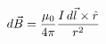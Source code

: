 \documentclass[preview]{standalone}
\begin{document}
\begin{align*}
\special{dvisvgm:raw <g id='unique000'>}d\vec{B} = \frac{\mu_0}{4\pi}\frac{I\,d\vec{l}\times\hat{r}}{r^2}\special{dvisvgm:raw </g>}
\end{align*}
\end{document}
